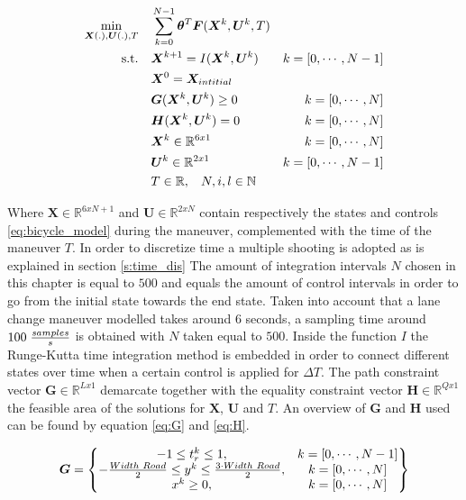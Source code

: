 \begin{equation}\label{opt:basic_opti_w}
\begin{aligned}
\min_{\bm{X}(.),\bm{U}(.), T} \quad & \sum_{k = 0}^{N-1} \bm{\theta}^T\bm{F}(\bm{X}^k,\bm{U}^k, T) \\
\textrm{s.t.} \quad & \bm{X}^{k+1} = I(\bm{X}^{k}, \bm{U}^{k}) & k = [0,\cdots, N-1]\\
& \bm{X}^{0}= \bm{X}_{intitial} \\
& \bm{G}(\bm{X}^{k},\bm{U}^{k}) \geq 0	& k = [0,\cdots, N]\\
& \bm{H}(\bm{X}^{k},\bm{U}^{k}) = 0	& k = [0,\cdots, N]\\
& \bm{X}^{k}\in \mathbb{R}^{6x1}  & k = [0,\cdots, N]\\
& \bm{U}^{k}\in \mathbb{R}^{2x1} \hspace{3 mm} & k = [0,\cdots, N-1]\\
& T \in \mathbb{R},\hspace{3 mm} N,i,l \in \mathbb{N}
\end{aligned}
\end{equation}

Where $\bm{X} \in \mathbb{R}^{6xN+1}$ and $\bm{U}\in \mathbb{R}^{2xN}$ contain respectively the states and controls  \ref{eq:bicycle_model} during the maneuver, complemented with the time of the maneuver $T$. In order to discretize time a multiple shooting is adopted as is explained in section \ref{s:time_dis} The amount of integration intervals $N$ chosen in this chapter is equal to $500$ and equals the amount of control intervals in order to go from the initial state towards the end state. Taken into account that a lane change maneuver modelled takes around $6$ seconds, a sampling time around $100 \hspace{1mm} \frac{samples}{s}$ is obtained with $N$ taken equal to $500$. Inside the function $I$ the Runge-Kutta time integration method is embedded in order to connect different states over time when a certain control is applied for $\Delta T$. The path constraint vector $\bm{G} \in \mathbb{R}^{Lx1}$ demarcate together with the equality constraint vector $\bm{H} \in \mathbb{R}^{Qx1}$ the feasible area of the solutions for $\bm{X}$, $\bm{U}$ and $T$. An overview of $\bm{G}$ and $\bm{H}$ used can be found by equation \ref{eq:G} and \ref{eq:H}.



\begin{equation}\label{eq:G}
\bm{G} =
\begin{Bmatrix}
-1 \leq t_r^k \leq 1, & k = [0,\cdots, N-1] \\
-\frac{Width\hspace{1mm}Road}{2} \leq y^k \leq \frac{3\cdot Width\hspace{1mm}Road}{2}, & k = [0,\cdots, N] \\
x^k \geq 0, & k = [0,\cdots, N] \\

\end{Bmatrix}
\end{equation}\\


